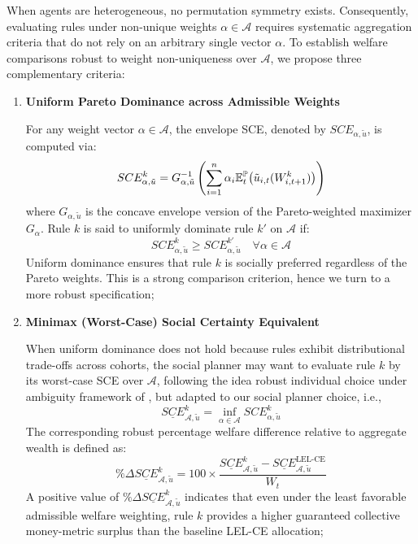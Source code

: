 When agents are heterogeneous, no permutation symmetry exists. Consequently, evaluating rules under non-unique weights $\alpha \in \mathcal{A}$ requires systematic aggregation criteria that do not rely on an arbitrary single vector $\alpha$. To establish welfare comparisons robust to weight non-uniqueness over $\mathcal{A}$, we propose three complementary criteria:
\begin{enumerate}
    \item \textbf{Uniform Pareto Dominance across Admissible Weights}
    
    For any weight vector $\alpha \in \mathcal{A}$, the envelope SCE, denoted by $SCE_{\alpha, \tilde{u}}$, is computed via:
    \begin{equation*}
        SCE_{\alpha, \tilde{u}}^k = G_{\alpha, \tilde{u}}^{-1}\left( \sum_{i=1}^n \alpha_i \mathbb{E}_t^{\mathbb{P}}\big(\tilde{u}_{i,t}(W_{i,t+1}^k)\big) \right)
    \end{equation*}
    where $G_{\alpha, \tilde{u}}$ is the concave envelope version of the Pareto-weighted maximizer $G_{\alpha}$. Rule $k$ is said to uniformly dominate rule $k'$ on $\mathcal{A}$ if:
    \begin{equation*}
        SCE_{\alpha, \tilde{u}}^k \geq SCE_{\alpha, \tilde{u}}^{k'} \quad \forall \alpha \in \mathcal{A}
    \end{equation*}
    Uniform dominance ensures that rule $k$ is socially preferred regardless of the Pareto weights. This is a strong comparison criterion, hence we turn to a more robust specification;
    \item \textbf{Minimax (Worst-Case) Social Certainty Equivalent}
    
    When uniform dominance does not hold because rules exhibit distributional trade-offs across cohorts, the social planner may want to evaluate rule $k$ by its worst-case SCE over $\mathcal{A}$, following the idea robust individual choice under ambiguity framework of \citet{Gilboa_Schmeidler_1989_maxmin}, but adapted to our social planner choice, i.e.,
    \begin{equation}
        \underline{SCE}^{k}_{\mathcal{A}, \tilde{u}} = \inf_{\alpha \in \mathcal{A}} SCE_{\alpha, \tilde{u}}^k
    \end{equation}
    The corresponding robust percentage welfare difference relative to aggregate wealth is defined as:
    \begin{equation*}
        \% \Delta \underline{SCE}^{k}_{\mathcal{A}, \tilde{u}} = 100 \times \frac{\underline{SCE}^{k}_{\mathcal{A}, \tilde{u}} - \underline{SCE}^{\text{LEL-CE}}_{\mathcal{A}, \tilde{u}}}{W_t}
    \end{equation*}
    A positive value of $\% \Delta \underline{SCE}^{k}_{\mathcal{A}, \tilde{u}}$ indicates that even under the least favorable admissible welfare weighting, rule $k$ provides a higher guaranteed collective money-metric surplus than the baseline LEL-CE allocation;


\end{enumerate}
